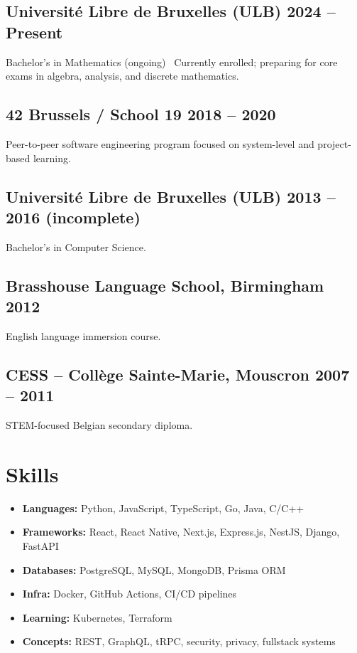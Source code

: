 \documentclass[11pt,a4paper]{article}
\begin{document}
\subsection{Université Libre de Bruxelles (ULB) \hfill 2024 -- Present}
Bachelor's in Mathematics (ongoing) \
Currently enrolled; preparing for core exams in algebra, analysis, and discrete mathematics.

\subsection{42 Brussels / School 19 \hfill 2018 -- 2020}
Peer-to-peer software engineering program focused on system-level and project-based learning.

\subsection{Université Libre de Bruxelles (ULB) \hfill 2013 -- 2016 (incomplete)}
Bachelor's in Computer Science.

\subsection{Brasshouse Language School, Birmingham \hfill 2012}
English language immersion course.

\subsection{CESS – Collège Sainte-Marie, Mouscron \hfill 2007 -- 2011}
STEM-focused Belgian secondary diploma.

\section*{Skills}
\begin{multicols}{2}
\begin{itemize}[leftmargin=*]
  \item \textbf{Languages:} Python, JavaScript, TypeScript, Go, Java, C/C++
  \item \textbf{Frameworks:} React, React Native, Next.js, Express.js, NestJS, Django, FastAPI
  \item \textbf{Databases:} PostgreSQL, MySQL, MongoDB, Prisma ORM
  \item \textbf{Infra:} Docker, GitHub Actions, CI/CD pipelines
  \item \textbf{Learning:} Kubernetes, Terraform
  \item \textbf{Concepts:} REST, GraphQL, tRPC, security, privacy, fullstack systems
\end{itemize}
\end{multicols}
\end{document}
